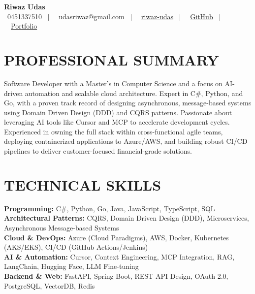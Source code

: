 \documentclass[letterpaper,11pt]{article}
\begin{document}
\begin{center}
    \textbf{\Huge Riwaz Udas} \\ \vspace{4pt}
    \scriptsize
    \faPhone* \ 0451337510 \ $|$ \
    \faEnvelope \ udasriwaz@gmail.com \ $|$ \
    \faLinkedin \ \href{https://www.linkedin.com/in/riwaz-udas-7aab521b1/}{riwaz-udas} \ $|$ \
    \faGithub \ \href{https://github.com/riwazudas}{GitHub} \ $|$ \
    \faGlobe \ \href{https://portfolio-website-496606.web.app}{Portfolio}
\end{center}

\section{PROFESSIONAL SUMMARY}
\begin{itemize}[leftmargin=0in, label={}]
\small{\item{Software Developer with a Master’s in Computer Science and a focus on AI-driven automation and scalable cloud architecture. Expert in C\#, Python, and Go, with a proven track record of designing asynchronous, message-based systems using Domain Driven Design (DDD) and CQRS patterns. Passionate about leveraging AI tools like Cursor and MCP to accelerate development cycles. Experienced in owning the full stack within cross-functional agile teams, deploying containerized applications to Azure/AWS, and building robust CI/CD pipelines to deliver customer-focused financial-grade solutions.}}
\end{itemize}

\section{TECHNICAL SKILLS}
\begin{itemize}[leftmargin=0in, label={}]
\small{\item{
\textbf{Programming:} C\#, Python, Go, Java, JavaScript, TypeScript, SQL \\
\textbf{Architectural Patterns:} CQRS, Domain Driven Design (DDD), Microservices, Asynchronous Message-based Systems \\
\textbf{Cloud \& DevOps:} Azure (Cloud Paradigms), AWS, Docker, Kubernetes (AKS/EKS), CI/CD (GitHub Actions/Jenkins) \\
\textbf{AI \& Automation:} Cursor, Context Engineering, MCP Integration, RAG, LangChain, Hugging Face, LLM Fine-tuning \\
\textbf{Backend \& Web:} FastAPI, Spring Boot, REST API Design, OAuth 2.0, PostgreSQL, VectorDB, Redis
}}
\end{itemize}
\end{document}
